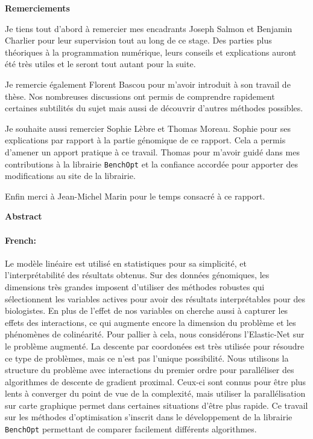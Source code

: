 \documentclass[a4paper, twoside]{memoir}
\begin{document}
\setcounter{page}{0}

\thispagestyle{plain}
\begin{center}
    \textbf{\Huge{Remerciements}}
\end{center}

Je tiens tout d'abord à remercier mes encadrants Joseph Salmon et Benjamin
Charlier pour leur supervision tout au long de ce stage.
Des parties plus théoriques à la programmation numérique, leurs conseils et
explications auront été très utiles et le seront tout autant pour la suite.

Je remercie également Florent Bascou pour m'avoir introduit à son travail de thèse.
Nos nombreuses discussions ont permis de comprendre rapidement certaines subtilités
du sujet mais aussi de découvrir d'autres méthodes possibles.

Je souhaite aussi remercier Sophie Lèbre et Thomas Moreau.
Sophie pour ses explications par rapport à la partie génomique
de ce rapport.
Cela a permis d'amener un apport pratique à ce travail.
Thomas pour m'avoir guidé dans mes contributions à la librairie \texttt{BenchOpt}
et la confiance accordée pour apporter des modifications au site de la librairie.

Enfin merci à Jean-Michel Marin pour le temps consacré à ce rapport.

\medskip
\begin{center}
    \textbf{\Huge{Abstract}}
\end{center}
\paragraph*{French:}

Le modèle linéaire est utilisé en statistiques pour sa simplicité,
et l'interprétabilité des résultats obtenus.
Sur des données génomiques, les dimensions très grandes imposent d'utiliser des
méthodes robustes qui sélectionnent les variables actives pour avoir des résultats
interprétables pour des biologistes.
En plus de l'effet de nos variables on cherche aussi à capturer les effets des
interactions, ce qui augmente encore la dimension du problème et les phénomènes
de colinéarité.
Pour pallier à cela, nous considérons l'Elastic-Net sur le problème augmenté.
La descente par coordonées \citep{wu2008coordinate} est très utilisée
pour résoudre ce type de problèmes, mais ce n'est pas l'unique possibilité.
Nous utilisons la structure du problème avec interactions du premier ordre pour
paralléliser des algorithmes de descente de gradient proximal.
Ceux-ci sont connus pour être plus lents à converger du point de vue de la
complexité, mais utiliser la parallélisation sur carte graphique permet dans
certaines situations d'être plus rapide.
Ce travail sur les méthodes d'optimisation s'inscrit dans le
développement de la librairie \texttt{BenchOpt} permettant de comparer
facilement différents algorithmes.
\end{document}
